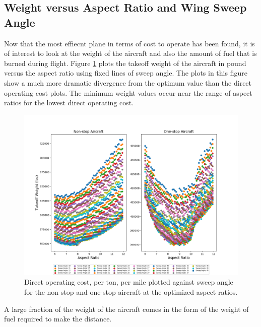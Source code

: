 \documentclass{article}
\begin{document}
    \subsection{Weight versus Aspect Ratio and Wing Sweep Angle}
    \label{sec:weight}
        \begin{flushleft}
            Now that the most effiecnt plane in terms of cost to operate has
            been found, it is of interest to look at the weight of the aircraft
            and also the amount of fuel that is burned during flight. Figure
            \ref{fig:AR} plots the takeoff weight of the aircraft in pound versus the
            aspect ratio using fixed lines of sweep angle. The plots in this
            figure show a much more dramatic divergence from the optimum value
            than the direct operating cost plots. The minimum weight values
            occur near the range of aspect ratios for the lowest direct
            operating cost.

            \begin{figure}[ht]
                \centering
                \includegraphics[scale=0.54]{Weight v Sweep Angle.PNG}
                \caption{Direct operating cost, per ton, per mile plotted against sweep angle for the non-stop and one-stop aircraft at the optimized aspect ratios.}
                \label{fig:AR}
            \end{figure}

            A large fraction of the weight of the aircraft comes in the form of the weight of fuel required to make the distance.

        \end{flushleft}
\end{document}
